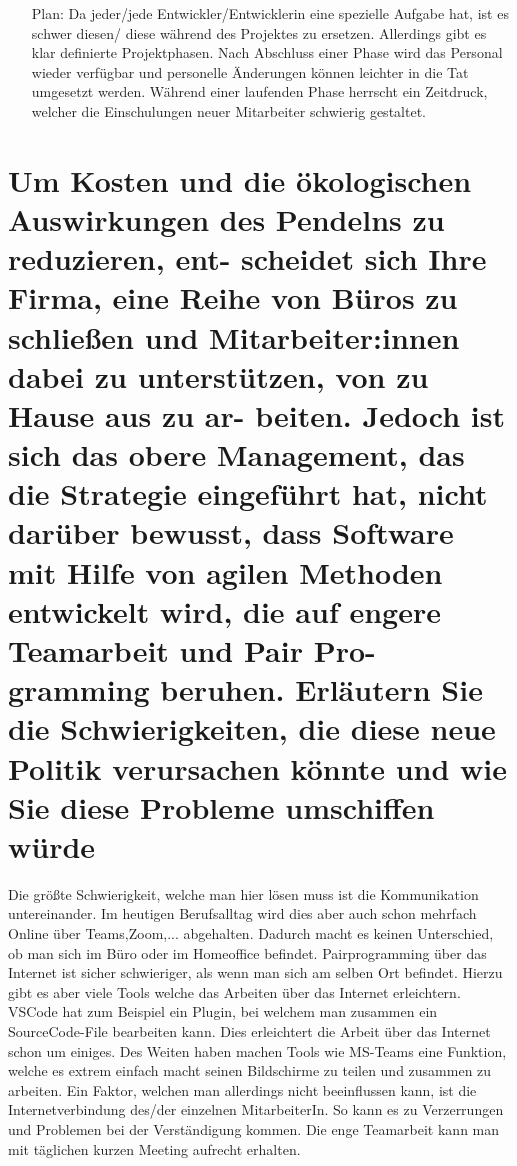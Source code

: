 \documentclass[12pt]{article}
\begin{document}
\begin{itemize}
\begin{itemize}
  \item[Plan:]Da jeder/jede Entwickler/Entwicklerin eine spezielle Aufgabe hat, ist es schwer diesen/ diese während des Projektes zu ersetzen. Allerdings gibt es klar definierte Projektphasen. Nach Abschluss einer Phase wird das Personal wieder verfügbar und personelle Änderungen können leichter in die Tat umgesetzt werden. Während einer laufenden Phase herrscht ein Zeitdruck, welcher die Einschulungen neuer Mitarbeiter schwierig gestaltet.
 \end{itemize}
\end{itemize}

\section{Um Kosten und die ökologischen Auswirkungen des Pendelns zu reduzieren, ent- scheidet sich Ihre Firma,
eine Reihe von Büros zu schließen und Mitarbeiter:innen dabei zu unterstützen, von zu Hause aus zu ar-
beiten. Jedoch ist sich das obere Management, das die Strategie eingeführt hat, nicht darüber bewusst,
dass Software mit Hilfe von agilen Methoden entwickelt wird, die auf engere Teamarbeit und Pair Pro-
gramming beruhen. Erläutern Sie die Schwierigkeiten, die diese neue Politik verursachen könnte und wie
Sie diese Probleme umschiffen würde}
Die größte Schwierigkeit, welche man hier lösen muss ist die Kommunikation untereinander. Im heutigen Berufsalltag wird dies aber auch schon mehrfach Online über Teams,Zoom,... abgehalten. Dadurch macht es keinen Unterschied, ob man sich im Büro oder im Homeoffice befindet. Pairprogramming über das Internet ist sicher schwieriger, als wenn man sich am selben Ort befindet. Hierzu gibt es aber viele Tools welche das Arbeiten über das Internet erleichtern. VSCode hat zum Beispiel ein Plugin, bei welchem man zusammen ein SourceCode-File bearbeiten kann. Dies erleichtert die Arbeit über das Internet schon um einiges. Des Weiten haben machen Tools wie MS-Teams eine Funktion, welche es extrem einfach macht seinen Bildschirme zu teilen und zusammen zu arbeiten. Ein Faktor, welchen man allerdings nicht beeinflussen kann, ist die Internetverbindung des/der einzelnen MitarbeiterIn. So kann es zu Verzerrungen und Problemen bei der Verständigung kommen. Die enge Teamarbeit kann man mit täglichen kurzen Meeting aufrecht erhalten.
\end{document}

